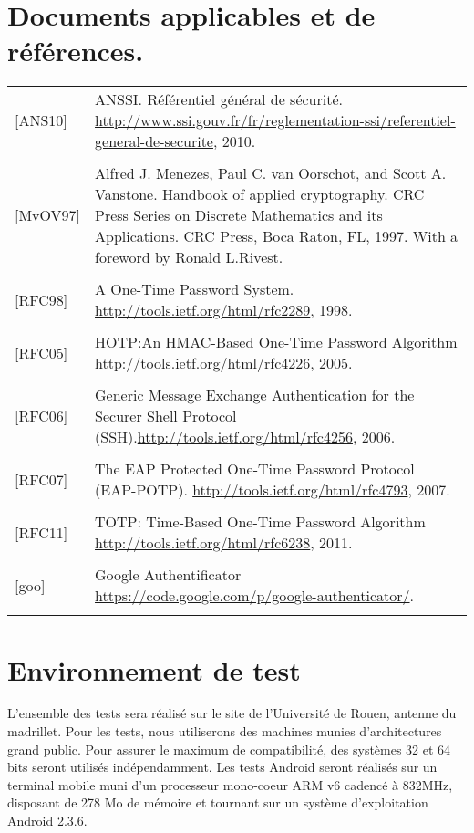 \documentclass{"../../res/univ-projet"}
\begin{document}
  \section{Documents applicables et de références.}
  \begin{tabular}{p{}>{\raggedright\arraybackslash}p{13cm}}
    {[ANS10]} & {ANSSI. Référentiel général de sécurité. \href{http://www.ssi.gouv.fr/fr/reglementation-ssi/referentiel-general-de-securite}{http://www.ssi.gouv.fr/fr/reglementation-ssi/referentiel-general-de-securite}, 2010.}
    \tabularnewline
    \\
    {[MvOV97]} & {Alfred J. Menezes, Paul C. van Oorschot, and Scott A. Vanstone. Handbook of applied cryptography. CRC Press Series on Discrete Mathematics and its Applications. CRC Press, Boca Raton, FL, 1997. With a foreword by Ronald L.Rivest.}
    \tabularnewline
    \\
    {[RFC98]} & {A One-Time Password System. \href{http://tools.ietf.org/html/rfc2289}{http://tools.ietf.org/html/rfc2289}, 1998.}
    \tabularnewline
    \\
    {[RFC05]} & {HOTP:An HMAC-Based One-Time Password Algorithm \href{http://tools.ietf.org/html/rfc4226}{http://tools.ietf.org/html/rfc4226}, 2005.}
    \tabularnewline
    \\
    {[RFC06]} & {Generic Message Exchange Authentication for the Securer Shell Protocol (SSH).\href{http://tools.ietf.org/html/rfc4256}{http://tools.ietf.org/html/rfc4256}, 2006.}
    \tabularnewline
    \\
    {[RFC07]} & {The EAP Protected One-Time Password Protocol (EAP-POTP). \href{http://tools.ietf.org/html/rfc4793}{http://tools.ietf.org/html/rfc4793}, 2007.}
    \tabularnewline
    \\
    {[RFC11]} & {TOTP: Time-Based One-Time Password Algorithm \href{http://tools.ietf.org/html/rfc6238}{http://tools.ietf.org/html/rfc6238}, 2011.}
    \tabularnewline
    \\
    {[goo]} & {Google Authentificator \href{https://code.google.com/p/google-authenticator/}{https://code.google.com/p/google-authenticator/}.}
    \tabularnewline
    \\
  \end{tabular}
  
  \section{Environnement de test}
  L'ensemble des tests sera réalisé sur le site de l'Université de Rouen, antenne du madrillet.
  Pour les tests, nous utiliserons des machines munies d'architectures grand public. Pour assurer le maximum de compatibilité, des systèmes 32 et 64 bits seront utilisés 
  indépendamment. Les tests Android seront réalisés sur un terminal mobile muni d'un processeur mono-coeur ARM v6 cadencé à 832MHz, disposant de 278 Mo de mémoire et tournant sur un 
  système d'exploitation Android 2.3.6.
  
\end{document}
